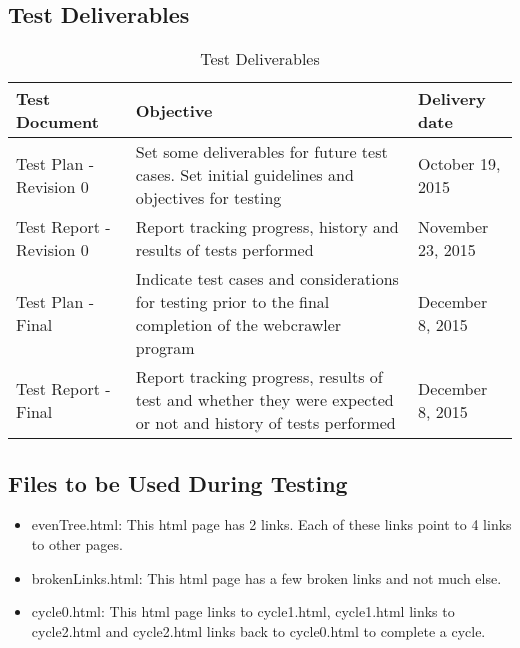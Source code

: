 \documentclass[12pt, titlepage]{article}
\begin{document}
\subsection{Test Deliverables}
\begin{table}[h!]
\begin{tabular}{| p{5cm} | p{5cm} | p{5cm} |}    \hline
Test Document&Objective&Delivery date\\ \hline
Test Plan - Revision 0&Set some deliverables for future test cases. Set initial guidelines and objectives for testing&October 19, 2015\\ \hline
Test Report -Revision 0&Report tracking progress, history and results of tests performed&November 23, 2015\\ \hline
Test Plan -Final&Indicate test cases and considerations for testing prior to the final completion of the webcrawler program&December 8, 2015\\ \hline
Test Report - Final&Report tracking progress, results of test and whether they were expected or not and history of tests performed&December 8, 2015\\ \hline
\end{tabular}
\caption{Test Deliverables}
\label{table:Test Deliverables}
\end{table}

\subsection{Files to be Used During Testing}
\begin{itemize}
\item evenTree.html: This html page has 2 links. Each of these links point to 4 links to other pages.
\item brokenLinks.html: This html page has a few broken links and not much else.
\item cycle0.html: This html page links to cycle1.html, cycle1.html links to cycle2.html and cycle2.html links back to cycle0.html to complete a cycle.
\end{itemize}
\end{document}
